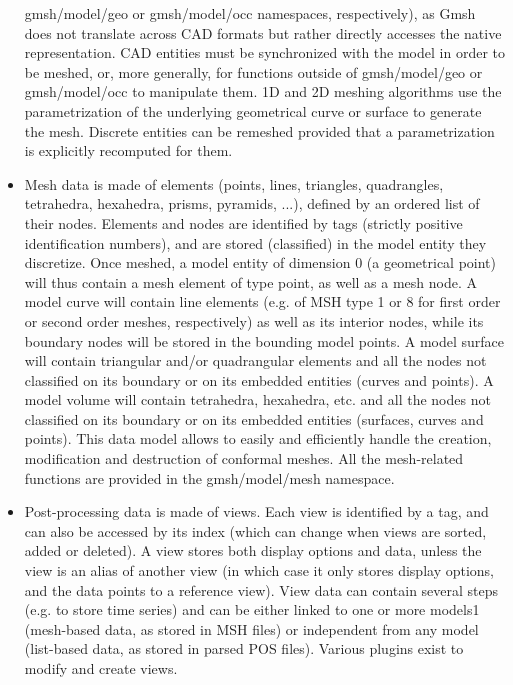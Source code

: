 \documentclass[dvipdfmx, 9pt, a4paper]{article}
\numberwithin{equation}{section}
\begin{document}
\begin{itemize}
gmsh/model/geo or gmsh/model/occ namespaces, respectively), as Gmsh does not translate across CAD formats but rather directly accesses the native representation. CAD entities must be synchronized with the model in order to be meshed, or, more generally, for functions outside of gmsh/model/geo or gmsh/model/occ to manipulate them. 1D and 2D meshing algorithms use the parametrization of the underlying geometrical curve or surface to generate the mesh. Discrete entities can be remeshed provided that a parametrization is
explicitly recomputed for them.
\item Mesh data is made of elements (points, lines, triangles, quadrangles, tetrahedra, hexahedra, prisms, pyramids, ...), defined by an ordered list of their nodes. Elements and nodes are identified by tags (strictly positive identification numbers), and are stored (classified) in the model entity they discretize. Once meshed, a model entity of dimension 0 (a geometrical point) will thus contain a mesh element of type point, as well as a mesh node. A model curve will contain line elements (e.g. of MSH type 1 or 8 for first order or second order meshes, respectively) as well as its interior nodes, while its boundary nodes will be stored in the bounding model points. A model surface will contain triangular and/or quadrangular elements and all the nodes not classified on its boundary or on its embedded entities (curves and points). A model volume will contain tetrahedra, hexahedra, etc. and all the nodes not classified on its boundary or on its embedded entities (surfaces, curves and points). This data model allows to easily and efficiently handle the creation, modification and destruction of conformal meshes. All the mesh-related functions are provided in the gmsh/model/mesh namespace.
\item Post-processing data is made of views. Each view is identified by a tag, and can also be accessed by its index (which can change when views are sorted, added or deleted). A view stores both display options and data, unless the view is an alias of another view (in which
case it only stores display options, and the data points to a reference view). View data can contain several steps (e.g. to store time series) and can be either linked to one or more models1 (mesh-based data, as stored in MSH files) or independent from any model (list-based data, as stored in parsed POS files). Various plugins exist to modify and create views.
\end{itemize}
\end{document}
